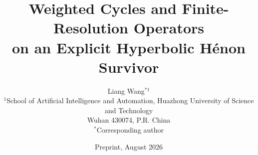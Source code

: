 \documentclass[11pt]{article}
\title{Weighted Cycles and Finite-Resolution Operators\\
on an Explicit Hyperbolic H\'enon Survivor}
\author{Liang Wang$^{*1}$\\
\small $^{1}$School of Artificial Intelligence and Automation, Huazhong University of Science and Technology\\
\small Wuhan 430074, P.R. China\\
\small $^*$Corresponding author}
\date{Preprint, August 2026}
\theoremstyle{definition}
\begin{document}
\maketitle

\begin{abstract}

\end{abstract}












\clearpage
\appendix


\end{document}
